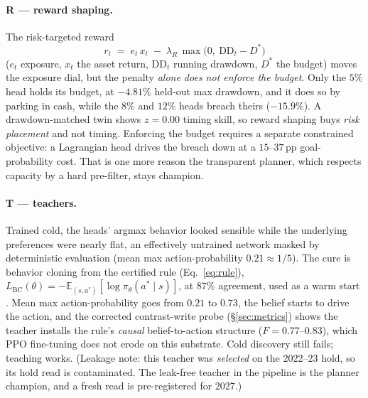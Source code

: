 \documentclass[11pt]{article}
\newcommand{\E}{\mathbb{E}}
\begin{document}
\paragraph{R --- reward shaping.} The risk-targeted reward
\begin{equation}
r_t \;=\; e_t\, x_t \;-\; \lambda_{R}\,\max\big(0,\ \text{DD}_t - D^{*}\big)
\label{eq:reward}
\end{equation}
($e_t$ exposure, $x_t$ the asset return, $\text{DD}_t$ running drawdown, $D^{*}$ the budget)
moves the exposure dial, but the penalty \emph{alone does not enforce the budget}. Only the
$5\%$ head holds its budget, at $-4.81\%$ held-out max drawdown, and it does so by parking in
cash, while the $8\%$ and $12\%$ heads breach theirs ($-15.9\%$). A drawdown-matched twin shows
$z = 0.00$ timing skill, so reward shaping buys \emph{risk placement} and not timing. Enforcing
the budget requires a separate constrained objective: a Lagrangian head drives the breach down at
a $15$--$37$\,pp goal-probability cost. That is one more reason the transparent planner, which
respects capacity by a hard pre-filter, stays champion.

\paragraph{T --- teachers.} Trained cold, the heads' argmax behavior looked sensible while the
underlying preferences were nearly flat, an effectively untrained network masked by
deterministic evaluation (mean max action-probability $0.21 \approx 1/5$). The cure is behavior
cloning from the certified rule (Eq.~\ref{eq:rule}),
$L_{\text{BC}}(\theta) = -\E_{(s,a^{*})}[\log \pi_\theta(a^{*}\mid s)]$, at $87\%$ agreement, used
as a warm start \citep{ross2011dagger,rusu2016distillation}. Mean max action-probability goes from
$0.21$ to $0.73$, the belief starts to drive the action, and the corrected contrast-write probe
(\S\ref{sec:metrics}) shows the teacher installs the rule's \emph{causal} belief-to-action
structure ($F = 0.77$--$0.83$), which PPO fine-tuning does not erode on this substrate. Cold
discovery still fails; teaching works. (Leakage note: this teacher was \emph{selected} on the
2022--23 hold, so its hold read is contaminated. The leak-free teacher in the pipeline is the
planner champion, and a fresh read is pre-registered for 2027.)
\end{document}
